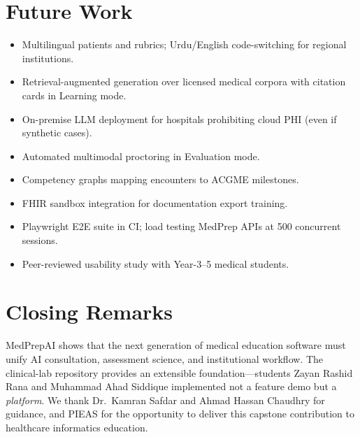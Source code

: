 \section{Future Work}
\begin{itemize}
  \item Multilingual patients and rubrics; Urdu/English code-switching for regional institutions.
  \item Retrieval-augmented generation over licensed medical corpora with citation cards in Learning mode.
  \item On-premise LLM deployment for hospitals prohibiting cloud PHI (even if synthetic cases).
  \item Automated multimodal proctoring in Evaluation mode.
  \item Competency graphs mapping encounters to ACGME milestones.
  \item FHIR sandbox integration for documentation export training.
  \item Playwright E2E suite in CI; load testing MedPrep APIs at 500 concurrent sessions.
  \item Peer-reviewed usability study with Year-3--5 medical students.
\end{itemize}

\section{Closing Remarks}
MedPrepAI shows that the next generation of medical education software must unify AI consultation, assessment science, and institutional workflow. The clinical-lab repository provides an extensible foundation---students Zayan Rashid Rana and Muhammad Ahad Siddique implemented not a feature demo but a \emph{platform}. We thank Dr.\ Kamran Safdar and Ahmad Hassan Chaudhry for guidance, and PIEAS for the opportunity to deliver this capstone contribution to healthcare informatics education.

